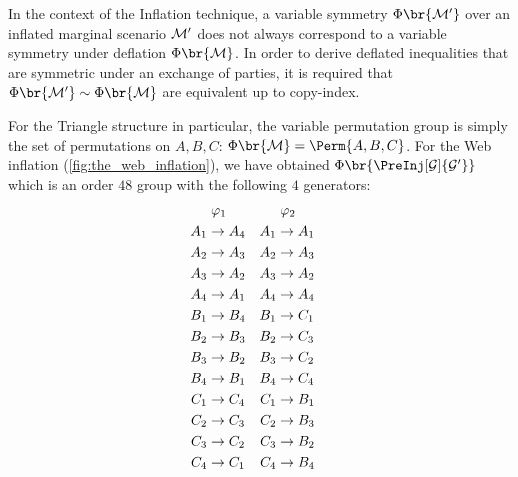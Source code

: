 \documentclass[aps, 10pt, english, twoside, pra, nofootinbib, tightenlines, longbibliography, superscriptaddress]{revtex4-1}
\begin{document}
    In the context of the Inflation technique, a variable symmetry $\Phi\br{\mscenario'}$ over an inflated marginal scenario $\mathcal{M}'$ does not always correspond to a variable symmetry under deflation $\Phi\br{\mscenario}$. In order to derive deflated inequalities that are symmetric under an exchange of parties, it is required that $\Phi\br{\mscenario'} \sim \Phi\br{\mscenario}$ are equivalent up to copy-index.

    For the Triangle structure in particular, the variable permutation group is simply the set of permutations on $A, B, C$: $\Phi\br{\mscenario} = \Perm{A, B, C}$. For the Web inflation (\cref{fig:the_web_inflation}), we have obtained $\gp\br{\PreInj[\graph]{\graph'}}$ which is an order $48$ group with the following $4$ generators:
    \begin{equation*}
    \begin{aligned}[c]
    &\hspace{1mm}\varphi_1 \\
    A_1 &\to A_4 \\A_2 &\to A_3 \\A_3 &\to A_2 \\A_4 &\to A_1 \\B_1 &\to B_4 \\B_2 &\to B_3 \\B_3 &\to B_2 \\B_4 &\to B_1 \\C_1 &\to C_4 \\C_2 &\to C_3 \\C_3 &\to C_2 \\C_4 &\to C_1
    \end{aligned}
    \quad
    \begin{aligned}[c]
    &\hspace{1mm}\varphi_2 \\
    A_1 &\to A_1 \\A_2 &\to A_3 \\A_3 &\to A_2 \\A_4 &\to A_4 \\B_1 &\to C_1 \\B_2 &\to C_3 \\B_3 &\to C_2 \\B_4 &\to C_4 \\C_1 &\to B_1 \\C_2 &\to B_3 \\C_3 &\to B_2 \\C_4 &\to B_4
    \end{aligned}
    \quad
    \begin{aligned}[c]

\end{aligned}
\end{equation*}
\end{document}
